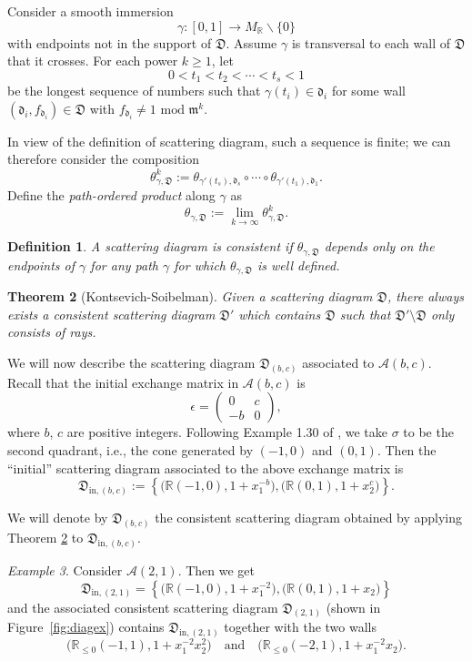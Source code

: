 \documentclass[10pt]{amsart}
\newtheorem{theorem}{Theorem}[section]
\newtheorem{defn}[theorem]{Definition}
\theoremstyle{remark}
\newtheorem{example}[theorem]{Example}
\numberwithin{equation}{section}
\newcommand{\RR}{\mathbb{R}}
\newcommand{\cA}{\mathcal{A}}
\newcommand{\fd}{\mathfrak{d}}
\newcommand{\fD}{\mathfrak{D}}
\newcommand{\fm}{\mathfrak{m}}
\begin{document}
Consider a smooth immersion
\[  
  \gamma: [0,1] \rightarrow M_{\mathbb{R}} \backslash  \{0 \}  
\]
with endpoints not in the support of $\fD$. Assume $\gamma$ is transversal to
each wall of $\fD$ that it crosses. For each power $k \geq 1$, let  
\[
  0< t_1 <  t_2 < \cdots < t_s < 1 
\]
be the longest sequence of numbers such that $\gamma(t_i)\in\fd_i$ for some wall
$(\fd_i,f_{\fd_i}) \in \fD$ with $f_{\fd_i} \neq 1 \text{ mod } \fm^k$.

In view of the definition of scattering diagram, such a sequence is finite; we
can therefore consider the composition 
\[
  \theta^k_{\gamma, \fD} :=
  \theta_{\gamma'(t_s),\fd_s} \circ \cdots \circ \theta_{\gamma'(t_1),\fd_1}.
\]
Define the \textit{path-ordered product} along $\gamma$ as
\[
  \theta_{\gamma, \fD} := \lim_{k \rightarrow \infty} \theta ^k_{\gamma, \fD}. 
\]

\begin{defn}
  A scattering diagram is \emph{consistent} if $\theta _{\gamma, \fD}$ depends
  only on the endpoints of $\gamma$ for any path $\gamma$ for which
  $\theta_{\gamma, \fD}$ is well defined.
\end{defn}

\begin{theorem}[Kontsevich-Soibelman] 
  \label{KS}
  Given a scattering diagram $\fD$, there always exists a consistent scattering
  diagram $\fD'$ which contains $\fD$ such that $\fD'\setminus\fD$ only consists
  of rays.
\end{theorem}

We will now describe the scattering diagram $\fD_{(b,c)}$ associated to 
$\cA(b,c)$.
Recall that the initial exchange matrix in $\cA(b,c)$ is 
\[
  \epsilon = \begin{pmatrix} 0 & c\\ -b & 0\end{pmatrix},
\]
where $b$, $c$ are positive integers.  Following Example 1.30 of \cite{GHKK}, we
take $\sigma$ to be the second quadrant, i.e., the cone generated by $(-1,0)$ and
$(0,1)$. Then the ``initial'' scattering diagram associated to the above exchange
matrix is
\[
  \fD_{\mathrm{in},(b,c)} := 
  \left\{
    \big( \RR (-1,0), 1+x_1^{-b}\big), 
    \big( \RR (0,1), 1+x_2^c\big) 
  \right\}.
\]

We will denote by $\fD_{(b,c)}$ the consistent scattering diagram obtained by
applying Theorem \ref{KS} to $\fD_{\mathrm{in},(b,c)}$.

\begin{example} 
  \label{ex}
  Consider $\cA(2,1)$. Then we get
  \[
    \fD_{\mathrm{in},(2,1)} =  
    \left\{ 
      \big(\RR (-1,0), 1+x_1^{-2}\big), 
      \big(\RR (0,1), 1+x_2\big)  
    \right\}   
  \]
  and the associated consistent scattering diagram $\fD_{(2,1)}$ (shown in
  Figure~\ref{fig:diagex}) contains $\fD_{\mathrm{in},(2,1)}$ together with
  the two walls
  \[ 
    \big( \RR_{\leq 0} (-1,1), 1+x_1^{-2}x_2^2 \big)
    \quad \mbox{and} \quad
    \big( \RR_{\leq 0} (-2,1), 1+x_1^{-2}x_2 \big).
  \]
\end{example}
\end{document}
